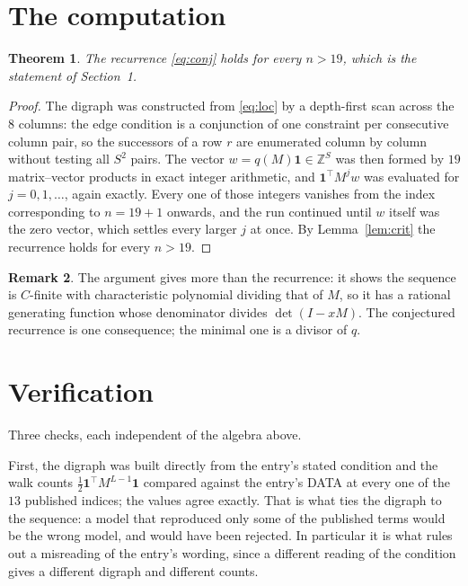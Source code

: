 \documentclass[11pt,a4paper]{article}
\theoremstyle{plain}
\newtheorem{theorem}{Theorem}
\theoremstyle{definition}
\newtheorem{remark}[theorem]{Remark}
\begin{document}
\section{The computation}

\begin{theorem}
The recurrence \eqref{eq:conj} holds for every $n>19$, which is the statement of
Section~1.
\end{theorem}

\begin{proof}
The digraph was constructed from \eqref{eq:loc} by a depth-first scan across the $8$
columns: the edge condition is a conjunction of one constraint per consecutive column
pair, so the successors of a row $r$ are enumerated column by column without testing all
$S^2$ pairs. The vector $w=q(M)\mathbf{1}\in\mathbb{Z}^{S}$ was then formed by $19$
matrix--vector products in exact integer arithmetic, and $\mathbf{1}^{\!\top}M^{j}w$ was
evaluated for $j=0,1,\dots$, again exactly. Every one of those integers vanishes from the
index corresponding to $n=19+1$ onwards, and the run continued until $w$ itself was the
zero vector, which settles every larger $j$ at once. By Lemma~\ref{lem:crit} the recurrence
holds for every $n>19$.
\end{proof}

\begin{remark}
The argument gives more than the recurrence: it shows the sequence is $C$-finite with
characteristic polynomial dividing that of $M$, so it has a rational generating function
whose denominator divides $\det(I-xM)$. The conjectured recurrence is one consequence; the
minimal one is a divisor of $q$.
\end{remark}

\section{Verification}

Three checks, each independent of the algebra above.

First, the digraph was built directly from the entry's stated condition and the walk counts
$\tfrac1{2}\mathbf{1}^{\!\top}M^{L-1}\mathbf{1}$ compared against the entry's DATA at
every one of the $13$ published indices; the values agree exactly. That is what ties
the digraph to the sequence: a model that reproduced only some of the published terms would
be the wrong model, and would have been rejected. In particular it is what rules out a
misreading of the entry's wording, since a different reading of the condition gives a
different digraph and different counts.
\end{document}
